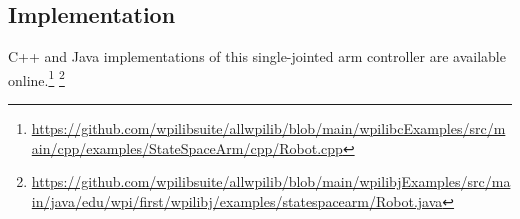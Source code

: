 \subsection{Implementation}

C++ and Java implementations of this single-jointed arm controller are available
online.\footnote{\url{https://github.com/wpilibsuite/allwpilib/blob/main/wpilibcExamples/src/main/cpp/examples/StateSpaceArm/cpp/Robot.cpp}}
\footnote{\url{https://github.com/wpilibsuite/allwpilib/blob/main/wpilibjExamples/src/main/java/edu/wpi/first/wpilibj/examples/statespacearm/Robot.java}}
